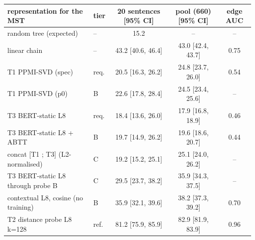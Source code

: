 \begin{tabular}{llccc}
\toprule
representation for the MST & tier & 20 sentences [95\% CI] & pool (660) [95\% CI] & edge AUC \\
\midrule
random tree (expected) & -- & 15.2 & -- & -- \\
linear chain & -- & 43.2 [40.6, 46.4] & 43.0 [42.4, 43.7] & 0.75 \\
T1 PPMI-SVD (spec) & req. & 20.5 [16.3, 26.2] & 24.8 [23.7, 26.0] & 0.54 \\
T1 PPMI-SVD (p0) & B & 22.6 [17.8, 28.4] & 24.5 [23.4, 25.6] & -- \\
T3 BERT-static L8 & req. & 18.4 [13.6, 26.0] & 17.9 [16.8, 18.9] & 0.46 \\
T3 BERT-static L8 + ABTT & B & 19.7 [14.9, 26.2] & 19.6 [18.6, 20.7] & 0.44 \\
concat [T1 ; T3] (L2-normalised) & C & 19.2 [15.2, 25.1] & 25.1 [24.0, 26.2] & -- \\
T3 BERT-static L8 through probe B & C & 29.5 [23.7, 38.2] & 35.9 [34.3, 37.5] & -- \\
contextual L8, cosine (no training) & B & 35.9 [32.1, 39.6] & 38.2 [37.3, 39.2] & 0.70 \\
T2 distance probe L8 k=128 & ref. & 81.2 [75.9, 85.9] & 82.9 [81.9, 83.9] & 0.96 \\
\bottomrule
\end{tabular}
